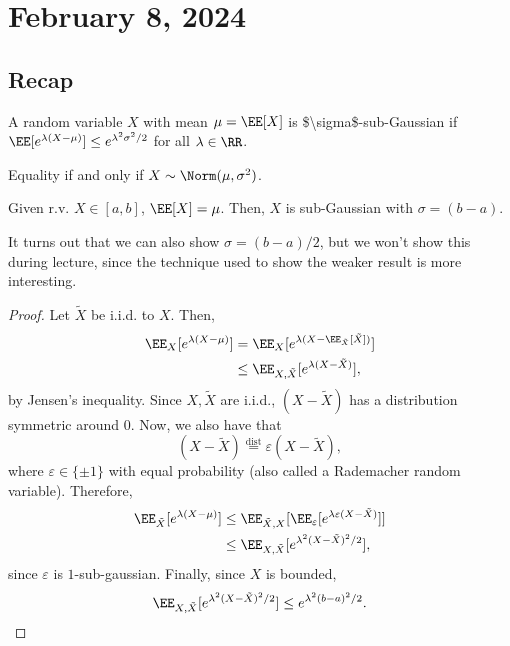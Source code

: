 \section{February 8, 2024}

\subsection{Recap}

\begin{definition}

A random variable $X$ with mean $\mu = \EE[X]$ is \ac{$\sigma$-sub-Gaussian} if $\EE[e^{\lambda(X - \mu)}] \leq e^{\lambda^2\sigma^2 / 2}$ for all $\lambda\in \RR$. 

Equality if and only if $X\sim \Norm(\mu, \sigma^2)$. 
\end{definition}

\begin{example}
\exlabel

Given r.v. $X\in [a,b]$, $\EE[X] = \mu$. Then, $X$ is sub-Gaussian with $\sigma=(b-a)$.
\end{example}

It turns out that we can also show $\sigma = (b-a)/2$, but we won't show this during lecture, since the technique used to show the weaker result is more interesting. 

\begin{proof}
Let $\tilde{X}$ be i.i.d. to $X$. Then,
\begin{align*}
	\EE_X[e^{\lambda(X-\mu)}] &= \EE_X[e^{\lambda(X - \EE_{\tilde{X}}[\tilde{X}])}] \\
														&\leq \EE_{X, \tilde{X}}[e^{\lambda(X-\tilde{X})}],
\end{align*}
by Jensen's inequality. Since $X,\tilde{X}$ are i.i.d., $(X-\tilde{X})$ has a distribution symmetric around $0$. Now, we also have that
\[(X-\tilde{X}) \overset{\text{dist}}{=} \varepsilon(X-\tilde{X}),\] 
where $\varepsilon \in \{\pm 1\}$ with equal probability (also called a \ac{Rademacher} random variable). Therefore, 
\begin{align*}
	\EE_{\tilde{X}}[e^{\lambda(X-\mu)}]&\leq \EE_{\tilde{X},X}[\EE_{\varepsilon}[e^{\lambda\varepsilon(X-\tilde{X})}]] \\
																		 &\leq \EE_{X, \tilde{X}}[e^{\lambda^2(X-\tilde{X})^2/2}],
\end{align*}
since $\varepsilon$ is $1$-sub-gaussian. Finally, since $X$ is bounded, 
\begin{align*}
	\EE_{X, \tilde{X}}[e^{\lambda^2(X-\tilde{X})^2/2}] \leq e^{\lambda^2(b-a)^2/2}.
\end{align*}
\end{proof}

